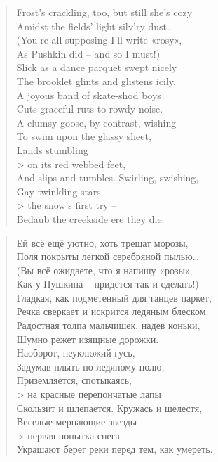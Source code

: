 \documentclass[../main.tex]{subfiles}
\begin{document}

\setlength\columnsep{1em}
\begin{paracol}{2}
\footnotesize

\setlength{\vleftmargin}{0pt}
\begin{verse}
    Frost's crackling, too, but still she's cozy \\
    Amidst the fields' light silv'ry dust\ldots \\
    (You're all supposing I'll write «rosy», \\
    As Pushkin did \--- and so I must!) \\
    Slick as a dance parquet swept nicely \\
    The brooklet glints and glistens icily. \\
    A joyous band of skate-shod boys \\
    Cuts graceful ruts to rowdy noise. \\
    A clumsy goose, by contrast, wishing \\
    To swim upon the glassy sheet, \\
    Lands stumbling \\>
        on its red webbed feet, \\
    And slips and tumbles. Swirling, swishing, \\
    Gay twinkling stars \--- \\>
        the snow's first try \--- \\
    Bedaub the creekside ere they die.
\end{verse}

\switchcolumn

\begin{verse}
    Ей всё ещё уютно, хоть трещат морозы, \\
    Поля покрыты легкой серебряной пылью\ldots \\
    (Вы всё ожидаете, что я напишу «розы», \\
    Как у Пушкина \--- придется так и сделать!) \\
    Гладкая, как подметенный для танцев паркет, \\
    Речка сверкает и искрится ледяным блеском. \\
    Радостная толпа мальчишек, надев коньки, \\
    Шумно режет изящные дорожки. \\
    Наоборот, неуклюжий гусь, \\
    Задумав плыть по ледяному полю, \\
    Приземляется, спотыкаясь, \\>
        на красные перепончатые лапы \\
    Скользит и шлепается. Кружась и шелестя, \\
    Веселые мерцающие звезды \--- \\>
        первая попытка снега \--- \\
    Украшают берег реки перед тем, как умереть.
\end{verse}

\end{paracol}
\end{document}
